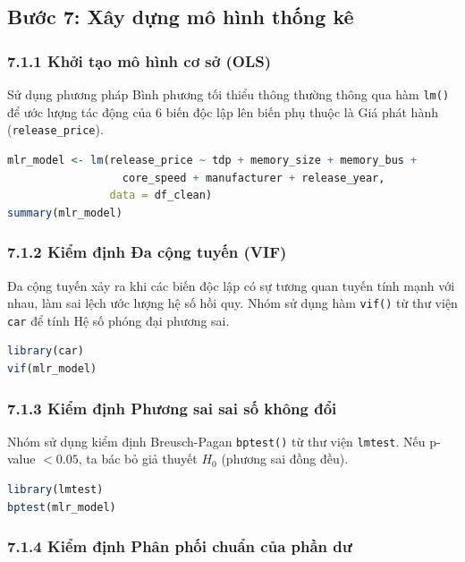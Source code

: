 \documentclass[a4paper]{article}
\begin{document}
\subsection{Bước 7: Xây dựng mô hình thống kê}

\subsubsection{7.1.1 Khởi tạo mô hình cơ sở (OLS)}

Sử dụng phương pháp Bình phương tối thiểu thông thường thông qua hàm \texttt{lm()} để ước lượng tác động của 6 biến độc lập lên biến phụ thuộc là Giá phát hành (\texttt{release\_price}).

\begin{lstlisting}[language=R, caption={Bước 7.1.1 --- Mô hình OLS cơ sở}]
mlr_model <- lm(release_price ~ tdp + memory_size + memory_bus +
                  core_speed + manufacturer + release_year,
                data = df_clean)
summary(mlr_model)
\end{lstlisting}

\subsubsection{7.1.2 Kiểm định Đa cộng tuyến (VIF)}

Đa cộng tuyến xảy ra khi các biến độc lập có sự tương quan tuyến tính mạnh với nhau, làm sai lệch ước lượng hệ số hồi quy. Nhóm sử dụng hàm \texttt{vif()} từ thư viện \texttt{car} để tính Hệ số phóng đại phương sai.

\begin{lstlisting}[language=R, caption={Bước 7.1.2 --- Kiểm định VIF}]
library(car)
vif(mlr_model)
\end{lstlisting}

\subsubsection{7.1.3 Kiểm định Phương sai sai số không đổi}

Nhóm sử dụng kiểm định Breusch-Pagan \texttt{bptest()} từ thư viện \texttt{lmtest}. Nếu p-value $< 0.05$, ta bác bỏ giả thuyết $H_0$ (phương sai đồng đều).

\begin{lstlisting}[language=R, caption={Bước 7.1.3 --- Kiểm định Breusch-Pagan}]
library(lmtest)
bptest(mlr_model)
\end{lstlisting}

\subsubsection{7.1.4 Kiểm định Phân phối chuẩn của phần dư}
\end{document}
